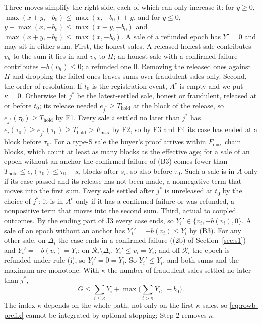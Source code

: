 \documentclass[10pt,a4paper]{article}
\newcommand{\Thold}{T_{\mathrm{hold}}}
\newcommand{\Fmax}{F_{\max}}
\newcommand{\cR}{\mathcal{R}}
\theoremstyle{plain}
\theoremstyle{remark}
\begin{document}
Three moves simplify the right side, each of which can only increase it: for $y\ge0$, $\max(x+y,-b_0)\le\max(x,-b_0)+y$, and for $y\le0$, $y+\max(x,-b_0)\le\max(x+y,-b_0)$ and $\max(x+y,-b_0)\le\max(x,-b_0)$. A sale of a refunded epoch has $Y'=0$ and may sit in either sum. First, the honest sales. A released honest sale contributes $v_h$ to the sum it lies in and $v_h$ to $H$; an honest sale with a confirmed failure contributes $-b(v_h)\le0$; a refunded one $0$. Removing the released ones against $H$ and dropping the failed ones leaves sums over fraudulent sales only. Second, the order of resolution. If $t_0$ is the registration event, $A^c$ is empty and we put $\kappa=0$. Otherwise let $j^*$ be the latest-settled sale, honest or fraudulent, released at or before $t_0$; its release needed $e_{j^*}\ge\Thold$ at the block of the release, so $e_{j^*}(\tau_0)\ge\Thold$ by F1. Every sale $i$ settled no later than $j^*$ has $e_i(\tau_0)\ge e_{j^*}(\tau_0)\ge\Thold>\Fmax$ by F2, so by F3 and F4 its case has ended at a block before $\tau_0$. For a type-S sale the buyer's proof arrives within $\Fmax$ chain blocks, which count at least as many blocks as the effective age; for a sale of an epoch without an anchor the confirmed failure of (B3) comes fewer than $\Thold\le e_i(\tau_0)\le\tau_0-s_i$ blocks after $s_i$, so also before $\tau_0$. Such a sale is in $A$ only if its case passed and its release has not been made, a nonnegative term that moves into the first sum. Every sale settled after $j^*$ is unreleased at $t_0$ by the choice of $j^*$; it is in $A^c$ only if it has a confirmed failure or was refunded, a nonpositive term that moves into the second sum. Third, actual to coupled outcomes. By the ending part of J3 every case ends, so $Y_i'\in\{v_i,-b(v_i),0\}$. A sale of an epoch without an anchor has $Y_i'=-b(v_i)\le Y_i$ by (B3). For any other sale, on $\Delta_i$ the case ends in a confirmed failure ((2b) of Section~\ref{sec:s1}) and $Y_i'=-b(v_i)=Y_i$; on $\cR_i\setminus\Delta_i$, $Y_i'\le v_i=Y_i$; and off $\cR_i$ the epoch is refunded under rule (i), so $Y_i'=0=Y_i$. So $Y_i'\le Y_i$, and both sums and the maximum are monotone. With $\kappa$ the number of fraudulent sales settled no later than $j^*$,
\begin{equation}\label{eq:rowb-prefix}
G\le\sum_{i\le\kappa}Y_i+\max\Big(\sum_{i>\kappa}Y_i,\,-b_0\Big).
\end{equation}
The index $\kappa$ depends on the whole path, not only on the first $\kappa$ sales, so \eqref{eq:rowb-prefix} cannot be integrated by optional stopping; Step 2 removes $\kappa$.
\end{document}
